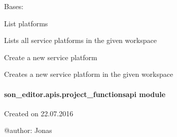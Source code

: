 \documentclass[letterpaper,10pt,english]{sphinxmanual}
\begin{document}
\begin{fulllineitems}
\label{_source/son_editor.apis:son_editor.apis.platformsapi.Platforms}
Bases: 

\begin{fulllineitems}
\label{_source/son_editor.apis:son_editor.apis.platformsapi.Platforms.get}
List platforms

Lists all service platforms in the given workspace

\end{fulllineitems}


\begin{fulllineitems}
\label{_source/son_editor.apis:son_editor.apis.platformsapi.Platforms.methods}
\end{fulllineitems}


\begin{fulllineitems}
\label{_source/son_editor.apis:son_editor.apis.platformsapi.Platforms.post}
Create a new service platform

Creates a new service platform in the given workspace

\end{fulllineitems}


\end{fulllineitems}



\paragraph{son\_editor.apis.project\_functionsapi module}
\label{_source/son_editor.apis:son-editor-apis-project-functionsapi-module}\label{_source/son_editor.apis:module-son_editor.apis.project_functionsapi}
Created on 22.07.2016

@author: Jonas
\end{document}
